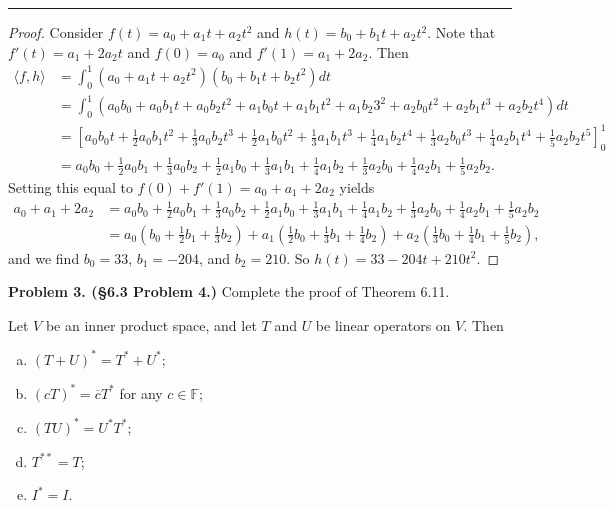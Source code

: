\documentclass[leqno]{article}
\theoremstyle{nonumberplain}
\newtheorem{proof}{Proof}
\begin{document}
\noindent\rule[0.5ex]{\linewidth}{1pt}

\begin{proof}
Consider $f(t)=a_0+a_1 t + a_2 t^2$ and $h(t)=b_0 + b_1 t +  a_2 t^2$. Note that $f'(t)=a_1 + 2a_2t$ and $f(0)=a_0$ and $f'(1)=a_1 + 2a_2$. Then
\begin{align*}
\langle f,h \rangle &= \int_0^1 (a_0+a_1 t + a_2 t^2)(b_0+b_1 t + b_2 t^2)dt\\
&= \int_0^1 (a_0 b_0 + a_0 b_1 t+a_0 b_2 t^2 + a_1 b_0 t + a_1 b_1 t^2 + a_1 b_2 3^2 + a_2 b_0 t^2 + a_2 b_1 t^3 + a_2 b_2 t^4) dt\\
&= \left[ a_0b_0 t + \frac{1}{2}a_0 b_1 t^2 + \frac{1}{3} a_0 b_2 t^3 + \frac{1}{2} a_1 b_0 t^2 + \frac{1}{3} a_1 b_1 t^3 + \frac{1}{4} a_1 b_2 t^4 + \frac{1}{3} a_2 b_0 t^3 + \frac{1}{4} a_2 b_1 t^4 + \frac{1}{5} a_2 b_2 t^5 \right]_0^1\\
&=a_0b_0  + \frac{1}{2}a_0 b_1  + \frac{1}{3} a_0 b_2  + \frac{1}{2} a_1 b_0  + \frac{1}{3} a_1 b_1  + \frac{1}{4} a_1 b_2  + \frac{1}{3} a_2 b_0  + \frac{1}{4} a_2 b_1  + \frac{1}{5} a_2 b_2. 
\end{align*}
Setting this equal to $f(0)+f'(1)=a_0+a_1+2a_2$ yields
\begin{align*}
a_0+a_1+2a_2 &=a_0b_0  + \frac{1}{2}a_0 b_1  + \frac{1}{3} a_0 b_2  + \frac{1}{2} a_1 b_0  + \frac{1}{3} a_1 b_1  + \frac{1}{4} a_1 b_2  + \frac{1}{3} a_2 b_0  + \frac{1}{4} a_2 b_1  + \frac{1}{5} a_2 b_2\\
&= a_0 \left( b_0 + \frac{1}{2}b_1 + \frac{1}{3} b_2 \right) + a_1 \left( \frac{1}{2} b_0 + \frac{1}{3} b_1 + \frac{1}{4} b_2 \right) + a_2 \left( \frac{1}{3} b_0 + \frac{1}{4} b_1 + \frac{1}{5} b_2 \right),
\end{align*}
and we find $b_0=33$, $b_1=-204$, and $b_2=210$.  So $h(t)=33-204t+210t^2$.
\end{proof}



\pagebreak




\noindent\textbf{Problem 3. (\S 6.3  Problem 4.)} Complete the proof of Theorem 6.11.

Let $V$ be an inner product space, and let $T$ and $U$ be linear operators on $V$. Then
\begin{enumerate}[(a)]
\item $(T+U)^* = T^* + U^*$;
\item $(cT)^* = \overline{c} T^*$ for any $c\in \mathbb{F}$;
\item $(TU)^*=U^* T^*$;
\item $T^{**} =T$;
\item $I^* = I$.
\end{enumerate}
\end{document}
